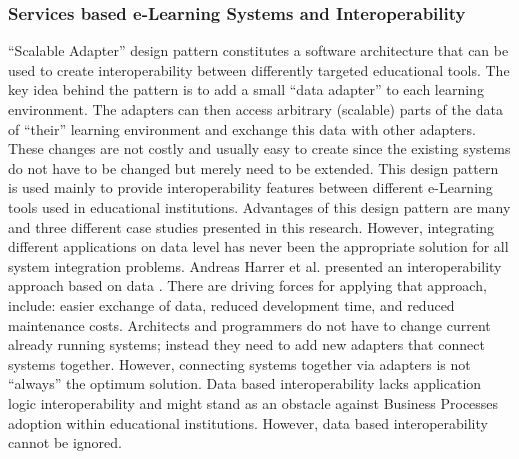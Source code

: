 \documentclass[12pt,a4paper,final,twoside,onecolumn,titlepage]{book}
\begin{document}
\subsubsection{Services based e-Learning Systems and Interoperability}
“Scalable Adapter” design pattern constitutes a software architecture that can be used to create interoperability between differently targeted educational tools. The key idea behind the pattern is to add a small “data adapter” to each learning environment. The adapters can then access arbitrary (scalable) parts of the data of “their” learning environment and exchange this data with other adapters. These changes are not costly and usually easy to create since the existing systems do not have to be changed but merely need to be extended. This design pattern is used mainly to provide interoperability features between different e-Learning tools used in educational institutions. Advantages of this design pattern are many and three different case studies presented in this research. However, integrating different applications on data level has never been the appropriate solution for all system integration problems.
Andreas Harrer et al. presented an interoperability approach based on data \cite{R64}. There are driving forces for applying that approach, include: easier exchange of data, reduced development time, and reduced maintenance costs. Architects and programmers do not have to change current already running systems; instead they need to add new adapters that connect systems together. However, connecting systems together via adapters is not “always” the optimum solution. Data based interoperability lacks application logic interoperability and might stand as an obstacle against Business Processes adoption within educational institutions. However, data based interoperability cannot be ignored.
\end{document}
